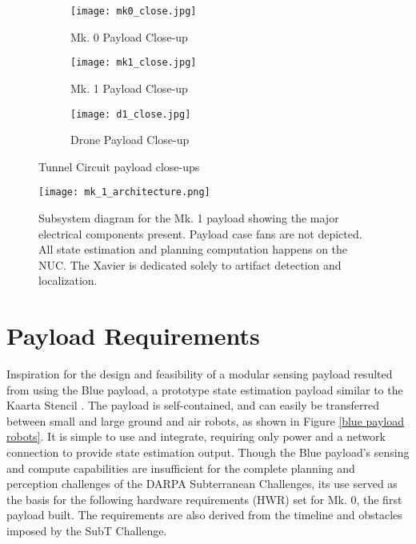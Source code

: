 \begin{figure}
	\centering
	\begin{subfigure}{0.32\textwidth}
		\texttt{[image: mk0\_close.jpg]}
		\caption{Mk. 0 Payload Close-up}
		\label{mk0_close}
	\end{subfigure}		
	\hfill
	\begin{subfigure}{0.32\textwidth}
		\texttt{[image: mk1\_close.jpg]}
		\caption{Mk. 1 Payload Close-up}
		\label{mk1_close}		
	\end{subfigure}
	\hfill
	\begin{subfigure}{0.32\textwidth}
		\texttt{[image: d1\_close.jpg]}
		\caption{Drone Payload Close-up}
		\label{drone_closeup}
	\end{subfigure}	
	\caption{Tunnel Circuit payload close-ups}
	\label{payloads}
\end{figure}


\begin{figure}
	\centering
	\texttt{[image: mk\_1\_architecture.png]}
	\caption[Subsystem diagram for Mk. 1 payload]{Subsystem diagram for the Mk. 1 payload showing the major electrical components present. Payload case fans are not depicted. All state estimation and planning computation happens on the NUC. The Xavier is dedicated solely to artifact detection and localization.}
	\label{mk_1_architecture}
\end{figure}

\section{Payload Requirements}

Inspiration for the design and feasibility of a modular sensing payload resulted from using the Blue payload, a prototype state estimation payload similar to the Kaarta Stencil \cite{kaarta}. The payload is self-contained, and can easily be transferred between small and large ground and air robots, as shown in Figure \ref{blue payload robots}. It is simple to use and integrate, requiring only power and a network connection to provide state estimation output. Though the Blue payload's sensing and compute capabilities are insufficient for the complete planning and perception challenges of the DARPA Subterranean Challenges, its use served as the basis for the following hardware requirements (HWR) set for Mk. 0, the first payload built. The requirements are also derived from the timeline and obstacles imposed by the SubT Challenge.

